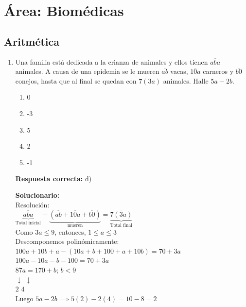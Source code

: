 \section*{Área: Biomédicas}



\subsection*{Aritmética}

\begin{enumerate}
	
	\item Una familia está dedicada a la crianza de animales y ellos tienen $\overline{aba}$ animales. A causa de una epidemia se le mueren $\overline{ab}$ vacas, $\overline{10a}$ carneros y $\overline{b0}$ conejos, hasta que al final se quedan con $\overline{7(3a)}$ animales. Halle $5a-2b$.
	\begin{enumerate}[label=\alph*)]
		\item 0
		\item -3
		\item 5
		\item 2
		\item -1
	\end{enumerate}
	\textbf{Respuesta correcta:} d)
	
	\vspace{2mm}
	\textbf{Solucionario:}\\
	Resolución: \\
	$\underbrace{\overline{aba}}_{\text{Total inicial}} - \underbrace{(\overline{ab} + \overline{10a} + \overline{b0})}_{\text{mueren}} = \underbrace{\overline{7(3a)}}_{\text{Total final}}$ \\
	Como $3a \le 9$, entonces, $1 \le a \le 3$ \\
	Descomponemos polinómicamente: \\
	$100a + 10b + a - (10a + b + 100 + a + 10b) = 70 + 3a$ \\
	$100a - 10a - b - 100 = 70 + 3a$ \\
	$87a = 170 + b$; $b < 9$ \\
	$\downarrow$ \hspace{6mm} $\downarrow$ \\
	$2$ \hspace{7.5mm} $4$ \\
	Luego $5a - 2b \implies 5(2) - 2(4) = 10 - 8 = 2$
	
	\vspace{6mm}
	

\end{enumerate}
